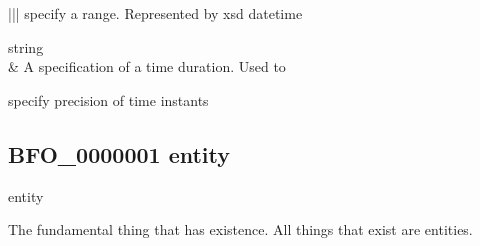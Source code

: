 \documentclass[letterpaper,10pt,english]{sphinxmanual}
\begin{document}
\begin{savenotes}
\begin{longtable}[c]{|*{2}{|}}
\sphinxAtStartPar
specify a range.  Represented by xsd datetime

\sphinxAtStartPar
string
\\
\hline
\sphinxAtStartPar
{\hyperref[\detokenize{doc-TemporalUnit::doc}]{}}
&
\sphinxAtStartPar
A specification of a time duration.  Used to

\sphinxAtStartPar
specify precision of time instants
\\
\hline
\end{longtable}\sphinxatlongtableend\end{savenotes}
\begin{quote}

\ignorespaces \end{quote}


\subsection{BFO\_0000001 \sphinxhyphen{} entity}
\label{\detokenize{doc-BFO_0000001:bfo-0000001-entity}}\label{\detokenize{doc-BFO_0000001:index-0}}\label{\detokenize{doc-BFO_0000001::doc}}
\begin{sphinxShadowBox}

\sphinxAtStartPar
entity
\end{sphinxShadowBox}

\begin{sphinxShadowBox}

\sphinxAtStartPar
{}
\end{sphinxShadowBox}

\begin{sphinxShadowBox}

\sphinxAtStartPar
The fundamental thing that has existence. All things that exist are entities.
\end{sphinxShadowBox}

\begin{sphinxShadowBox}

\sphinxAtStartPar
{}
\end{sphinxShadowBox}
\begin{quote}

\ignorespaces \end{quote}
\end{document}

